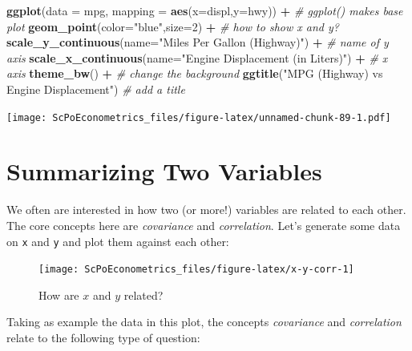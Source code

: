\documentclass[]{book}
\newenvironment{Shaded}{\begin{snugshade}}{\end{snugshade}}
\newcommand{\KeywordTok}[1]{\textcolor[rgb]{0.13,0.29,0.53}{\textbf{#1}}}
\newcommand{\DataTypeTok}[1]{\textcolor[rgb]{0.13,0.29,0.53}{#1}}
\newcommand{\DecValTok}[1]{\textcolor[rgb]{0.00,0.00,0.81}{#1}}
\newcommand{\StringTok}[1]{\textcolor[rgb]{0.31,0.60,0.02}{#1}}
\newcommand{\CommentTok}[1]{\textcolor[rgb]{0.56,0.35,0.01}{\textit{#1}}}
\newcommand{\OperatorTok}[1]{\textcolor[rgb]{0.81,0.36,0.00}{\textbf{#1}}}
\newcommand{\NormalTok}[1]{#1}
\theoremstyle{definition}
\theoremstyle{definition}
\theoremstyle{definition}
\theoremstyle{remark}
\begin{document}
\begin{Shaded}
\begin{Highlighting}[]
\KeywordTok{ggplot}\NormalTok{(}\DataTypeTok{data =}\NormalTok{ mpg, }\DataTypeTok{mapping =} \KeywordTok{aes}\NormalTok{(}\DataTypeTok{x=}\NormalTok{displ,}\DataTypeTok{y=}\NormalTok{hwy)) }\OperatorTok{+}\StringTok{   }\CommentTok{# ggplot() makes base plot}
\StringTok{  }\KeywordTok{geom_point}\NormalTok{(}\DataTypeTok{color=}\StringTok{"blue"}\NormalTok{,}\DataTypeTok{size=}\DecValTok{2}\NormalTok{) }\OperatorTok{+}\StringTok{     }\CommentTok{# how to show x and y?}
\StringTok{  }\KeywordTok{scale_y_continuous}\NormalTok{(}\DataTypeTok{name=}\StringTok{"Miles Per Gallon (Highway)"}\NormalTok{) }\OperatorTok{+}\StringTok{  }\CommentTok{# name of y axis}
\StringTok{  }\KeywordTok{scale_x_continuous}\NormalTok{(}\DataTypeTok{name=}\StringTok{"Engine Displacement (in Liters)"}\NormalTok{) }\OperatorTok{+}\StringTok{ }\CommentTok{# x axis}
\StringTok{  }\KeywordTok{theme_bw}\NormalTok{() }\OperatorTok{+}\StringTok{    }\CommentTok{# change the background}
\StringTok{  }\KeywordTok{ggtitle}\NormalTok{(}\StringTok{"MPG (Highway) vs Engine Displacement"}\NormalTok{)   }\CommentTok{# add a title}
\end{Highlighting}
\end{Shaded}

\texttt{[image: ScPoEconometrics\_files/figure-latex/unnamed-chunk-89-1.pdf]}

\section{Summarizing Two Variables}\label{summarize-two}

We often are interested in how two (or more!) variables are related to
each other. The core concepts here are \emph{covariance} and
\emph{correlation}. Let's generate some data on \texttt{x} and
\texttt{y} and plot them against each other:

\begin{figure}

{\centering \texttt{[image: ScPoEconometrics\_files/figure-latex/x-y-corr-1]} 

}

\caption{How are $x$ and $y$ related?}\label{fig:x-y-corr}
\end{figure}

Taking as example the data in this plot, the concepts \emph{covariance}
and \emph{correlation} relate to the following type of question:
\end{document}
